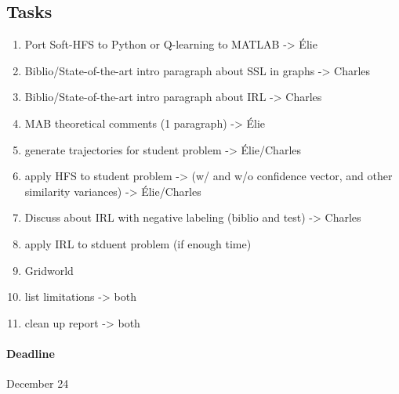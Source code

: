 \documentclass{article}
\begin{document}



\begin{appendices}
\section{Tasks}

\begin{enumerate}
    \item Port Soft-HFS to Python or Q-learning to MATLAB -> Élie
    \item Biblio/State-of-the-art intro paragraph about SSL in graphs -> Charles
    \item Biblio/State-of-the-art intro paragraph about IRL -> Charles
    \item MAB theoretical comments (1 paragraph) -> Élie
    \item generate trajectories for student problem -> Élie/Charles
    \item apply HFS to student problem -> (w/ and w/o confidence vector, and other similarity variances) -> Élie/Charles
    \item Discuss about IRL with negative labeling (biblio and test) -> Charles
    \item apply IRL to stduent problem (if enough time)
    \item Gridworld
    \item list limitations -> both
    \item clean up report -> both
\end{enumerate}

\paragraph{Deadline} December 24

\end{appendices}
\end{document}
